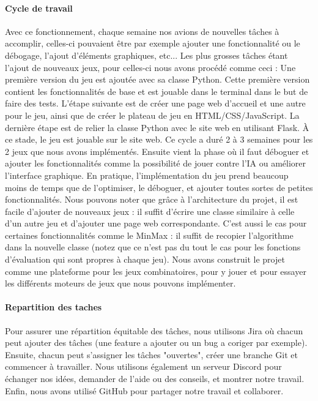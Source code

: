 \paragraph{Cycle de travail}
Avec ce fonctionnement, chaque semaine nos avions de nouvelles tâches à accomplir, celles-ci pouvaient être par exemple ajouter une fonctionnalité ou le débogage, l'ajout d'éléments graphiques, etc...
Les plus grosses tâches étant l'ajout de nouveaux jeux, pour celles-ci nous avons procédé comme ceci :
Une première version du jeu est ajoutée avec sa classe Python. Cette première version contient les fonctionnalités de base et est jouable dans le terminal dans le but de faire des tests. 
L'étape suivante est de créer une page web d'accueil et une autre pour le jeu, ainsi que de créer le plateau de jeu en HTML/CSS/JavaScript. La dernière étape est de relier la classe 
Python avec le site web en utilisant Flask.
À ce stade, le jeu est jouable sur le site web. Ce cycle a duré 2 à 3 semaines pour les 2 jeux que nous avons implémentés. Ensuite vient la phase où il faut déboguer et ajouter les 
fonctionnalités comme la possibilité de jouer contre l'IA ou améliorer l'interface graphique. En pratique, l'implémentation du jeu prend beaucoup moins de temps que de l'optimiser, 
le déboguer, et ajouter toutes sortes de petites fonctionnalités.
Nous pouvons noter que grâce à l'architecture du projet, il est facile d'ajouter de nouveaux jeux : il suffit d'écrire une classe similaire à celle d'un autre jeu et d'ajouter une 
page web correspondante. C'est aussi le cas pour certaines fonctionnalités comme le MinMax : il suffit de recopier l'algorithme dans la nouvelle classe (notez que ce n'est pas du 
tout le cas pour les fonctions d'évaluation qui sont propres à chaque jeu).
Nous avons construit le projet comme une plateforme pour les jeux combinatoires, pour y jouer et pour essayer les différents moteurs de jeux que nous pouvons implémenter.

\paragraph{Repartition des taches}
Pour assurer une répartition équitable des tâches, nous utilisons Jira où chacun peut ajouter des tâches (une feature a ajouter ou un bug a coriger par exemple). 
Ensuite, chacun peut s'assigner les tâches "ouvertes", créer une branche Git et commencer à travailler. Nous utilisons également un serveur Discord pour échanger 
nos idées, demander de l'aide ou des conseils, et montrer notre travail. Enfin, nous avons utilisé GitHub pour partager notre travail et collaborer.



